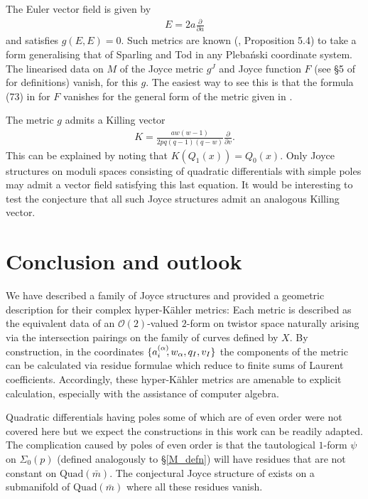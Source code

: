 \documentclass[a4paper,12pt,reqno]{amsart}
\numberwithin{equation}{section}
\numberwithin{counter2}{section}
\begin{document}
The Euler vector field is given by 
\begin{align}
E = 2a\frac{\partial}{\partial a}
\end{align}
and satisfies $g(E,E) = 0$.  Such metrics are known (\cite{DM24},  Proposition 5.4) to take a form generalising that of Sparling and Tod \cite{ST} in any Pleba\'nski coordinate system.  The linearised data on $M$ of the Joyce metric $g^J$ and Joyce function $F$ (see \S 5 of \cite{B4} for definitions) vanish,  for this $g$.  The easiest way to see this is that the formula (73) in \cite{B4} for $F$ vanishes for the general form of the metric given in \cite{DM24}.   \par 
The metric $g$ admits a Killing vector
\begin{align}
K = \frac{aw(w-1)}{2pq(q-1)(q-w)}\frac{\partial}{\partial v}. 
\end{align}
This can be explained by noting that $K(Q_1(x)) = Q_0(x)$.  Only Joyce structures on moduli spaces consisting of quadratic differentials with simple poles may admit a vector field satisfying this last equation.  It would be interesting to test the conjecture that all such Joyce structures admit an analogous Killing vector.  

\section{Conclusion and outlook}
We have described a family of Joyce structures and provided a geometric description for their complex hyper-K\"ahler metrics: Each metric is described as the equivalent data of an $\mathcal{O}(2)$-valued $2$-form on twistor space naturally arising via the intersection pairings on the family of curves defined by $X$.  By construction,  in the coordinates $\{a_{i}^{(\alpha)}\hspace{-1mm},w_\alpha,  q_I,  v_I\}$ the components of the metric can be calculated via residue formulae which reduce to finite sums of Laurent coefficients.  Accordingly,  these hyper-K\"ahler metrics are amenable to explicit calculation,  especially with the assistance of computer algebra.  \par  
Quadratic differentials having poles some of which are of even order were not covered here but we expect the constructions in this work can be readily adapted.  The complication caused by poles of even order is that the tautological $1$-form $\psi$ on $\Sigma_0(p)$ (defined analogously to \S \ref{M_defn}) will have residues that are not constant on $\text{Quad}(\bar{m})$.  The conjectural Joyce structure of \cite{BdM} exists on a submanifold of $\text{Quad}(\bar{m})$ where all these residues vanish.  \par 
\end{document}
